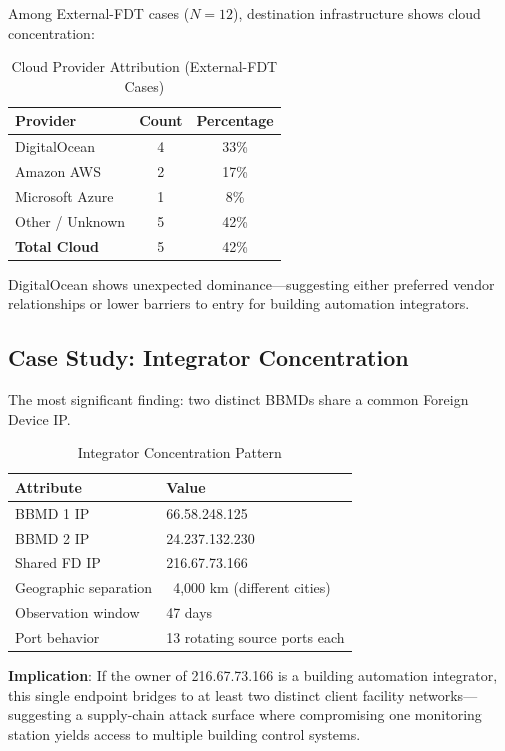 \documentclass[11pt,a4paper]{article}
\begin{document}
Among External-FDT cases ($N=12$), destination infrastructure shows 
cloud concentration:

\begin{table}[h]
\centering
\begin{tabular}{lcc}
\toprule
\textbf{Provider} & \textbf{Count} & \textbf{Percentage} \\
\midrule
DigitalOcean & 4 & 33\% \\
Amazon AWS & 2 & 17\% \\
Microsoft Azure & 1 & 8\% \\
Other / Unknown & 5 & 42\% \\
\midrule
\textbf{Total Cloud} & 5 & 42\% \\
\bottomrule
\end{tabular}
\caption{Cloud Provider Attribution (External-FDT Cases)}
\label{tab:clouds}
\end{table}

DigitalOcean shows unexpected dominance---suggesting either 
preferred vendor relationships or lower barriers to entry for 
building automation integrators.

\subsection{Case Study: Integrator Concentration}

The most significant finding: two distinct BBMDs share a common 
Foreign Device IP.

\begin{table}[h]
\centering
\begin{tabular}{ll}
\toprule
\textbf{Attribute} & \textbf{Value} \\
\midrule
BBMD 1 IP & 66.58.248.125 \\
BBMD 2 IP & 24.237.132.230 \\
Shared FD IP & 216.67.73.166 \\
Geographic separation & ~4,000 km (different cities) \\
Observation window & 47 days \\
Port behavior & 13 rotating source ports each \\
\bottomrule
\end{tabular}
\caption{Integrator Concentration Pattern}
\label{tab:concentration}
\end{table}

\textbf{Implication}: If the owner of 216.67.73.166 is a building 
automation integrator, this single endpoint bridges to at least 
two distinct client facility networks---suggesting a supply-chain 
attack surface where compromising one monitoring station yields 
access to multiple building control systems.
\end{document}

